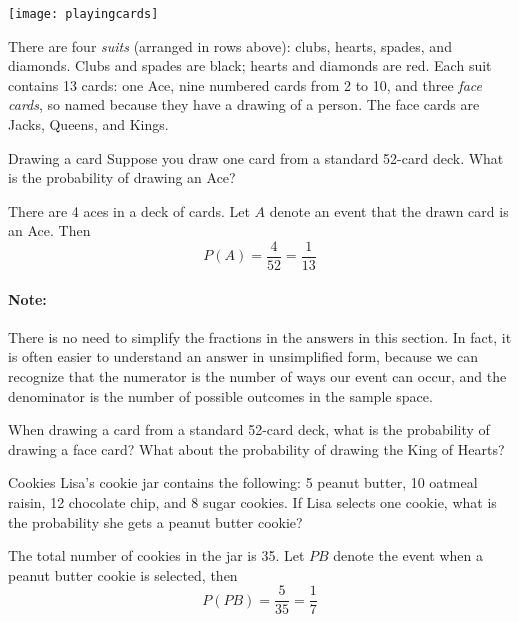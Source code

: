 \begin{center}
\texttt{[image: playingcards]}
\end{center}

There are four \emph{suits} (arranged in rows above): clubs, hearts, spades, and diamonds.  Clubs and spades are black; hearts and diamonds are red.  Each suit contains 13 cards: one Ace, nine numbered cards from 2 to 10, and three \emph{face cards}, so named because they have a drawing of a person.  The face cards are Jacks, Queens, and Kings.

\begin{example}[https://www.youtube.com/watch?v=h_RyIlkgV2M]{Drawing a card}
Suppose you draw one card from a standard 52-card deck. What is the probability of drawing an Ace?

\sol
There are 4 aces in a deck of cards. Let $A$ denote an event that the drawn card is an Ace. Then
\[  P(A) = \boxed{\frac{4}{52}}  = \frac{1}{13} \]
\end{example}

\paragraph{Note:} There is no need to simplify the fractions in the answers in this section.  In fact, it is often easier to understand an answer in unsimplified form, because we can recognize that the numerator is the number of ways our event can occur, and the denominator is the number of possible outcomes in the sample space.

\begin{try}
When drawing a card from a standard 52-card deck, what is the probability of drawing a face card?  What about the probability of drawing the King of Hearts?
\end{try}

\begin{example}[https://www.youtube.com/watch?v=7DSjUMJHnTk]{Cookies}
Lisa's cookie jar contains the following: 5 peanut butter, 10 oatmeal raisin, 12 chocolate chip, and 8 sugar cookies. If Lisa selects one cookie, what is the probability she gets a peanut butter cookie? 

\sol
{} The total number of cookies in the jar is 35. Let $PB$ denote the event when a peanut butter cookie is selected, then
\[  P(PB) = \boxed{\frac{5}{35}} = \frac{1}{7} \]
\end{example}

